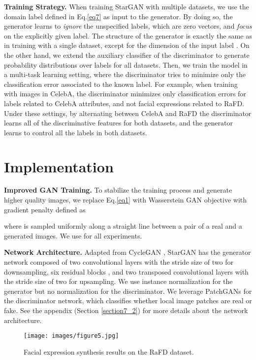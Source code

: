 \documentclass[10pt,twocolumn,letterpaper]{article}
\begin{document}
\noindent\textbf{Training Strategy.} When training StarGAN with multiple datasets, we use the domain label  defined in Eq.\thinspace\eqref{eq7} as input to the generator. By doing so, the generator learns to \textit{ignore} the unspecified labels, which are zero vectors, and \textit{focus} on the explicitly given label. The structure of the generator is exactly the same as in training with a single dataset, except for the dimension of the input label . On the other hand, we extend the auxiliary classifier of the discriminator to generate probability distributions over labels for all datasets. Then, we train the model in a multi-task learning setting, where the discriminator tries to minimize only the classification error associated to the known label. For example, when training with images in CelebA, the discriminator minimizes only classification errors for labels related to CelebA attributes, and not facial expressions related to RaFD. Under these settings, by alternating between CelebA and RaFD the discriminator learns all of the discriminative features for both datasets, and the generator learns to control all the labels in both datasets. 

\section{Implementation} \label{implementation}

\noindent \textbf{Improved GAN Training.}
To stabilize the training process and generate higher quality images, we replace Eq.\thinspace\eqref{eq1} with Wasserstein GAN objective with gradient penalty \cite{arjovsky2017wasserstein,gulrajani2017improved} defined as

where  is sampled uniformly along a straight line between a pair of a real and a generated images. We use  for all experiments.

\medskip

\noindent \textbf{Network Architecture.}
Adapted from CycleGAN \cite{zhu2017unpaired}, StarGAN has the generator network composed of two convolutional layers with the stride size of two for downsampling, six residual blocks \cite{he2016deep}, and two transposed convolutional layers with the stride size of two for upsampling. We use instance normalization \cite{ulyanov2016instance} for the generator but no normalization for the discriminator. We leverage PatchGANs \cite{Isola_2017_CVPR,li2016precomputed,zhu2017unpaired} for the discriminator network, which classifies whether local image patches are real or fake. See the appendix (Section \ref{section7_2}) for more details about the network architecture.
\begin{figure*}[ht]
\centering
\centerline{\texttt{[image: images/figure5.jpg]}}
\caption{Facial expression synthesis results on the RaFD dataset.}
\label{qual_rafd}
\vspace{-0.1in}  
\end{figure*}
\end{document}
